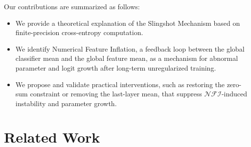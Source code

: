 \documentclass{article}
\theoremstyle{plain}
\theoremstyle{definition}
\theoremstyle{remark}
\begin{document}
Our contributions are summarized as follows:
\begin{itemize}
    \item We provide a theoretical explanation of the Slingshot Mechanism based on finite-precision cross-entropy computation.
    \item We identify Numerical Feature Inflation, a feedback loop between the global classifier mean and the global feature mean, as a mechanism for abnormal parameter and logit growth after long-term unregularized training.
    \item We propose and validate practical interventions, such as restoring the zero-sum constraint or removing the last-layer mean, that suppress $\mathcal{NFI}$-induced instability and parameter growth.
\end{itemize}




\section{Related Work}

\end{document}
